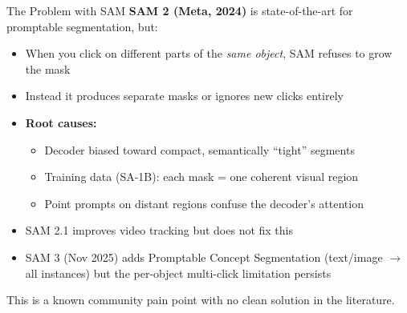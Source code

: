 \documentclass[10pt, aspectratio=169]{beamer}
\begin{document}
\begin{frame}{The Problem with SAM}
  \textbf{SAM 2 (Meta, 2024)} is state-of-the-art for promptable segmentation, but:

  \vspace{0.3em}
  \begin{itemize}
    \item When you click on different parts of the \textit{same object}, SAM refuses to grow the mask
    \item Instead it produces separate masks or ignores new clicks entirely
    \item \textbf{Root causes:}
    \begin{itemize}
      \item Decoder biased toward compact, semantically ``tight'' segments
      \item Training data (SA-1B): each mask = one coherent visual region
      \item Point prompts on distant regions confuse the decoder's attention
    \end{itemize}
    \item SAM 2.1 improves video tracking but does not fix this
    \item SAM 3 (Nov 2025) adds Promptable Concept Segmentation (text/image $\rightarrow$ all instances) but the per-object multi-click limitation persists
  \end{itemize}

  \vspace{0.3em}
  This is a known community pain point with no clean solution in the literature.
\end{frame}
\end{document}
